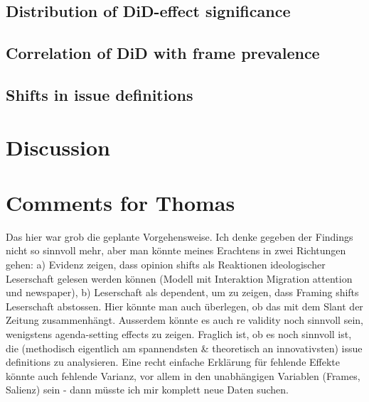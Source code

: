 \documentclass{article}
\begin{document}

\subsection{Distribution of DiD-effect significance}


\subsection{Correlation of DiD with frame prevalence}


\subsection{Shifts in issue definitions}


\section{Discussion}

\newpage

\section{Comments for Thomas}

Das hier war grob die geplante Vorgehensweise. Ich denke gegeben der Findings nicht so sinnvoll mehr, aber man könnte meines Erachtens in zwei Richtungen gehen: a) Evidenz zeigen, dass opinion shifts als Reaktionen ideologischer Leserschaft gelesen werden können (Modell mit Interaktion Migration attention und newspaper), b) Leserschaft als dependent, um zu zeigen, dass Framing shifts Leserschaft abstossen. Hier könnte man auch überlegen, ob das mit dem Slant der Zeitung zusammenhängt. Ausserdem könnte es auch re validity noch sinnvoll sein, wenigstens agenda-setting effects zu zeigen. Fraglich ist, ob es noch sinnvoll ist, die (methodisch eigentlich am spannendsten \& theoretisch an innovativsten) issue definitions zu analysieren. Eine recht einfache Erklärung für fehlende Effekte könnte auch fehlende Varianz, vor allem in den unabhängigen Variablen (Frames, Salienz) sein - dann  müsste ich mir komplett neue Daten suchen.
\end{document}
